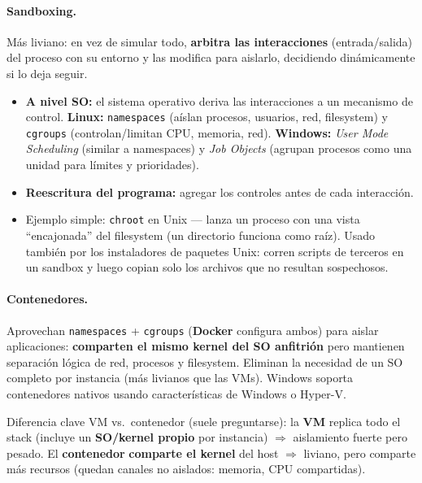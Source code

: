 \documentclass[../main.tex]{subfiles}
\begin{document}
\paragraph{Sandboxing.} Más liviano: en vez de simular todo, \textbf{arbitra las
interacciones} (entrada/salida) del proceso con su entorno y las modifica para
aislarlo, decidiendo dinámicamente si lo deja seguir.
\begin{itemize}[noitemsep]
  \item \textbf{A nivel SO:} el sistema operativo deriva las interacciones a un
        mecanismo de control. \textbf{Linux:} \texttt{namespaces} (aíslan procesos,
        usuarios, red, filesystem) y \texttt{cgroups} (controlan/limitan CPU,
        memoria, red). \textbf{Windows:} \textit{User Mode Scheduling} (similar a
        namespaces) y \textit{Job Objects} (agrupan procesos como una unidad para
        límites y prioridades).
  \item \textbf{Reescritura del programa:} agregar los controles antes de cada
        interacción.
  \item Ejemplo simple: \texttt{chroot} en Unix --- lanza un proceso con una vista
        ``encajonada'' del filesystem (un directorio funciona como raíz). Usado
        también por los instaladores de paquetes Unix: corren scripts de terceros
        en un sandbox y luego copian solo los archivos que no resultan sospechosos.
\end{itemize}

\paragraph{Contenedores.} Aprovechan \texttt{namespaces} + \texttt{cgroups}
(\textbf{Docker} configura ambos) para aislar aplicaciones: \textbf{comparten el
mismo kernel del SO anfitrión} pero mantienen separación lógica de red, procesos y
filesystem. Eliminan la necesidad de un SO completo por instancia (más livianos que
las VMs). Windows soporta contenedores nativos usando características de Windows o
Hyper-V.

\begin{ojo}
Diferencia clave VM vs.\ contenedor (suele preguntarse): la \textbf{VM} replica todo
el stack (incluye un \textbf{SO/kernel propio} por instancia) $\Rightarrow$
aislamiento fuerte pero pesado. El \textbf{contenedor} \textbf{comparte el kernel}
del host $\Rightarrow$ liviano, pero comparte más recursos (quedan canales no
aislados: memoria, CPU compartidas).
\end{ojo}
\end{document}
